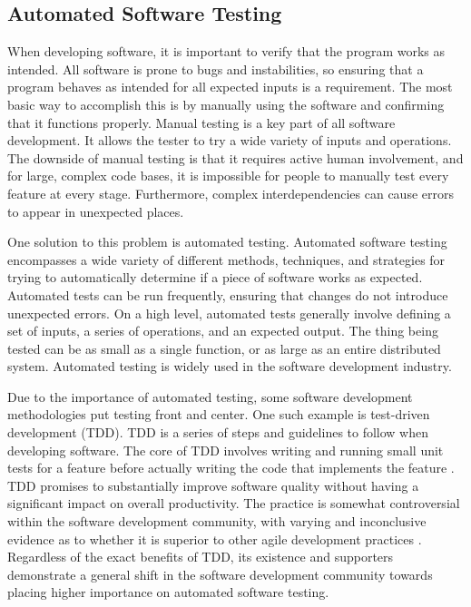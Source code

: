 \documentclass[12pt]{article}
\begin{document}
\begin{onehalfspacing}
\subsection{Automated Software Testing}

When developing software, it is important to verify that the program
works as intended. All software is prone to bugs and instabilities, so
ensuring that a program behaves as intended for all expected inputs is a
requirement. The most basic way to accomplish this is by manually using
the software and confirming that it functions properly. Manual testing
is a key part of all software development. It allows the tester to try a
wide variety of inputs and operations. The downside of manual testing is
that it requires active human involvement, and for large, complex code
bases, it is impossible for people to manually test every feature at
every stage. Furthermore, complex interdependencies can cause errors to
appear in unexpected places.

One solution to this problem is automated testing. Automated software
testing encompasses a wide variety of different methods, techniques, and
strategies for trying to automatically determine if a piece of software
works as expected. Automated tests can be run frequently, ensuring that
changes do not introduce unexpected errors. On a high level, automated
tests generally involve defining a set of inputs, a series of
operations, and an expected output. The thing being tested can be as
small as a single function, or as large as an entire distributed system.
Automated testing is widely used in the software development industry.

Due to the importance of automated testing, some software development
methodologies put testing front and center. One such example is
test-driven development (TDD). TDD is a series of steps and guidelines
to follow when developing software. The core of TDD involves writing and
running small unit tests for a feature before actually writing the code
that implements the feature \parencite{bhat2006evaluating}. 
TDD promises to substantially improve software quality without having a significant impact on overall productivity. The practice is somewhat controversial within the software development community, with varying and inconclusive
evidence as to whether it is superior to other agile development practices \parencite{karac2018we}. 
Regardless of the exact benefits of TDD, its existence and supporters demonstrate a general shift in the software development community towards placing higher importance on automated software testing.


\end{onehalfspacing}
\end{document}
